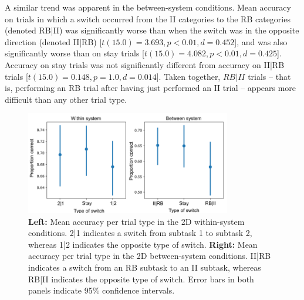\documentclass[doc, floatsintext]{apa7}
\begin{document}
A similar trend was apparent in the between-system
conditions. Mean accuracy on trials in which a switch
occurred from the II categories to the RB categories
(denoted RB|II) was significantly worse than when the switch
was in the opposite direction (denoted II|RB) [$t(15.0) =
3.693, p < 0.01, d = 0.452$], and was also significantly
worse than on stay trials [$t(15.0) = 4.082, p < 0.01, d =
0.425$]. Accuracy on stay trials was not significantly
different from accuracy on II|RB trials [$t(15.0) = 0.148, p
= 1.0, d = 0.014$]. Taken together, $RB|II$ trials -- that
is, performing an RB trial after having just performed an II
trial -- appears more difficult than any other trial type.

%
%

\begin{figure}[h!]
    \centering
    \includegraphics[width=0.8\textwidth]{../figures/fig5.png}
    \caption{
        \textbf{Left:} Mean accuracy per trial type in the 2D
        within-system conditions. 2|1 indicates a switch from
        subtask 1 to subtask 2, whereas 1|2 indicates the
        opposite type of switch.
        \textbf{Right:} Mean accuracy per trial type in the 2D
        between-system conditions. II|RB indicates a switch from
        an RB subtask to an II subtask, whereas RB|II indicates
        the opposite type of switch.
        Error bars in both panels indicate 95\% confidence intervals.
    }
    \label{fig_5}
\end{figure}
\end{document}
